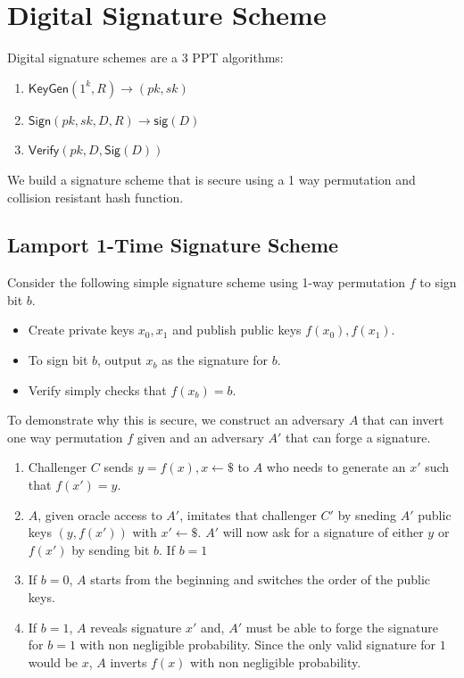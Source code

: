 \documentclass[11pt]{article}
\begin{document}
\section{Digital Signature Scheme}
Digital signature schemes are a 3 PPT algorithms:
\begin{enumerate}
    \item $\textsf{KeyGen}(1^k,R) \rightarrow (pk,sk)$
    \item $\textsf{Sign}(pk,sk,D,R) \rightarrow \textsf{sig}(D)$
    \item $\textsf{Verify}(pk,D,\textsf{Sig}(D))$
\end{enumerate}

We build a signature scheme that is secure using a 1 way permutation and collision resistant hash function.
\subsection{Lamport 1-Time Signature Scheme}
Consider the following simple signature scheme using 1-way permutation $f$ to sign bit $b$.
\begin{itemize}
    \item Create private keys $x_0, x_1$ and publish public keys $f(x_0), f(x_1)$.
    \item To sign bit $b$, output $x_b$ as the signature for $b$.
    \item Verify simply checks that $f(x_b) = b$.
\end{itemize}

To demonstrate why this is secure, we construct an adversary $A$ that can invert one way permutation $f$ given and an adversary $A'$ that can forge a signature.
\begin{enumerate}
    \item Challenger $C$ sends $y = f(x), x\leftarrow \$$ to $A$ who needs to generate an $x'$ such that $f(x') = y$.
    \item $A$, given oracle access to $A'$, imitates that challenger $C'$ by sneding $A'$ public keys $(y, f(x'))$ with $x' \leftarrow \$$. $A'$ will now ask for a signature of either $y$ or $f(x')$ by sending bit $b$. If $b=1$
    \item If $b=0$, $A$ starts from the beginning and switches the order of the public keys.
    \item If $b=1$, $A$ reveals signature $x'$ and, $A'$ must be able to forge the signature for $b=1$ with non negligible probability. Since the only valid signature for $1$ would be $x$, $A$ inverts $f(x)$ with non negligible probability.
\end{enumerate}
\end{document}
